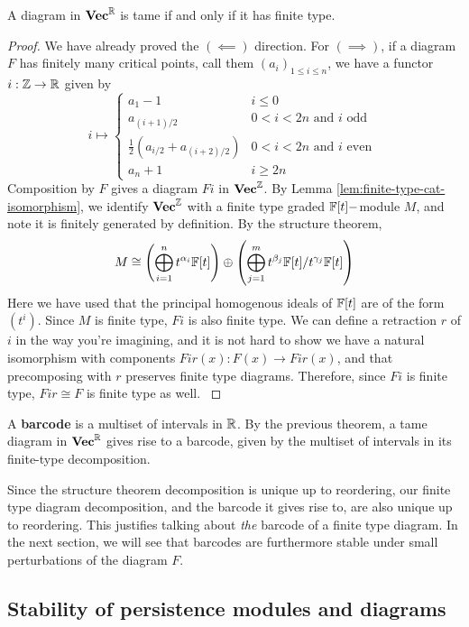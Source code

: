\begin{theorem}
    A diagram in $\mathbf{Vec}^{\mathbb{R}}$ is tame if and only if it has finite type.
\end{theorem}
\begin{proof}
We have already proved the $(\impliedby)$ direction. For $(\implies)$, if a diagram $F$ has finitely many critical points, call them $(a_i)_{1 \leq i \leq n}$, we have a functor 
$i:\mathbb{Z}\rightarrow \mathbb{R}$ given by
$$i\mapsto \begin{cases} a_1-1& i\leq 0\\
a_{(i+1)/2} & 0< i < 2n \text{ and } i \text{ odd }\\
\frac{1}{2}(a_{i/2}+a_{(i+2)/2}) & 0< i< 2n \text{ and } i \text{ even }\\
a_n+1 & i\geq 2n\end{cases}$$
Composition by $F$ gives a diagram $Fi$ in $\mathbf{Vec}^{\mathbb{Z}}$. By Lemma \ref{lem:finite-type-cat-isomorphism}, we identify $\mathbf{Vec}^{\mathbb{Z}}$ with a finite type graded $\mathbb{F}[t]-$module $M$, and note it is finitely generated by definition. By the structure theorem,  $$M\cong \left(\bigoplus_{i=1}^{n}t^{\alpha_i} \mathbb{F}[t] \right)\oplus \left(\bigoplus_{j=1}^{m} t^{\beta_j}\mathbb{F}[t]/t^{\gamma_j} \mathbb{F}[t]\right)$$
Here we have used that the principal homogenous ideals of $\mathbb{F}[t]$ are of the form $(t^i)$. Since $M$ is finite type, $Fi$ is also finite type. We can define a retraction $r$ of $i$ in the way you're imagining, and it is not hard to show we have a natural isomorphism with components $Fir(x):F(x)\rightarrow Fir(x)$, and that precomposing with $r$ preserves finite type diagrams. Therefore, since $Fi$ is finite type, $Fir\cong F$ is finite type as well. \cite{Bubenik2014}
\end{proof}
\begin{definition}\label{def:barcode}
    A \textbf{barcode} is a multiset of intervals in $\mathbb{R}$. By the previous theorem, a tame diagram in $\mathbf{Vec}^{\mathbb{R}}$ gives rise to a barcode, given by the multiset of intervals in its finite-type decomposition.
\end{definition}

Since the structure theorem decomposition is unique up to reordering, our finite type diagram decomposition, and the barcode it gives rise to, are also unique up to reordering. This justifies talking about \textit{the} barcode of a finite type diagram. In the next section, we will see that barcodes are furthermore stable under small perturbations of the diagram $F$.

\subsection{Stability of persistence modules and diagrams}
\label{sec:stability}

